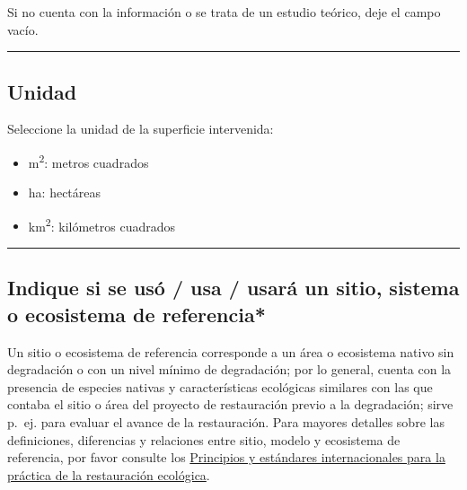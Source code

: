 \documentclass[
]{book}
\providecommand{\tightlist}{%
  \setlength{\itemsep}{0pt}\setlength{\parskip}{0pt}}
\begin{document}
Si no cuenta con la información o se trata de un estudio teórico, deje el campo vacío.

\begin{center}\rule{0.5\linewidth}{0.5pt}\end{center}

\hypertarget{unidad-1}{%
\subsection*{Unidad}\label{unidad-1}}

Seleccione la unidad de la superficie intervenida:

\begin{itemize}
\tightlist
\item
  m\textsuperscript{2}: metros cuadrados
\item
  ha: hectáreas
\item
  km\textsuperscript{2}: kilómetros cuadrados
\end{itemize}

\begin{center}\rule{0.5\linewidth}{0.5pt}\end{center}

\hypertarget{indique-si-se-usuxf3-usa-usaruxe1-un-sitio-sistema-o-ecosistema-de-referencia}{%
\subsection*{\texorpdfstring{{Indique si se usó / usa / usará un sitio, sistema o ecosistema de referencia*}}{Indique si se usó / usa / usará un sitio, sistema o ecosistema de referencia*}}\label{indique-si-se-usuxf3-usa-usaruxe1-un-sitio-sistema-o-ecosistema-de-referencia}}

Un sitio o ecosistema de referencia corresponde a un área o ecosistema nativo sin degradación o con un nivel mínimo de degradación; por lo general, cuenta con la presencia de especies nativas y características ecológicas similares con las que contaba el sitio o área del proyecto de restauración previo a la degradación; sirve p.~ej. para evaluar el avance de la restauración. Para mayores detalles sobre las definiciones, diferencias y relaciones entre sitio, modelo y ecosistema de referencia, por favor consulte los \href{https://cdn.ymaws.com/www.ser.org/resource/resmgr/Spanish_SER_International_St.pdf}{Principios y estándares internacionales para la práctica de la restauración ecológica}.
\end{document}
